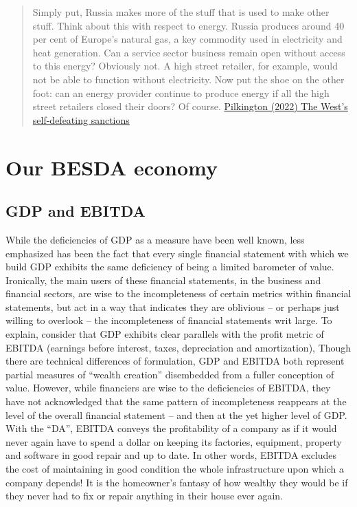 \documentclass[
]{book}
\begin{document}
\begin{quote}
Simply put, Russia makes more of the stuff that is used to make other stuff. Think about this with respect to energy. Russia produces around 40 per cent of Europe's natural gas, a key commodity used in electricity and heat generation. Can a service sector business remain open without access to this energy? Obviously not. A high street retailer, for example, would not be able to function without electricity. Now put the shoe on the other foot: can an energy provider continue to produce energy if all the high street retailers closed their doors? Of course.
\href{https://thecritic.co.uk/the-wests-self-defeating-sanctions/}{Pilkington (2022) The West's self-defeating sanctions}
\end{quote}

\hypertarget{our-besda-economy}{%
\section{Our BESDA economy}\label{our-besda-economy}}

\hypertarget{gdp-and-ebitda}{%
\subsection{GDP and EBITDA}\label{gdp-and-ebitda}}

While the deficiencies of GDP as a measure have been well known, less emphasized has
been the fact that every single financial statement with which we build GDP exhibits the same
deficiency of being a limited barometer of value. Ironically, the main users of these financial
statements, in the business and financial sectors, are wise to the incompleteness of certain
metrics within financial statements, but act in a way that indicates they are oblivious -- or
perhaps just willing to overlook -- the incompleteness of financial statements writ large.
To explain, consider that GDP exhibits clear parallels with the profit metric of EBITDA
(earnings before interest, taxes, depreciation and amortization), Though there are technical
differences of formulation, GDP and EBITDA both represent partial measures of ``wealth
creation'' disembedded from a fuller conception of value. However, while financiers are wise
to the deficiencies of EBITDA, they have not acknowledged that the same pattern of
incompleteness reappears at the level of the overall financial statement -- and then at the yet
higher level of GDP.
With the ``DA'', EBITDA conveys the profitability of a company as if it would never again have
to spend a dollar on keeping its factories, equipment, property and software in good repair
and up to date. In other words, EBITDA excludes the cost of maintaining in good condition the
whole infrastructure upon which a company depends! It is the homeowner's fantasy of how
wealthy they would be if they never had to fix or repair anything in their house ever again.
\end{document}
